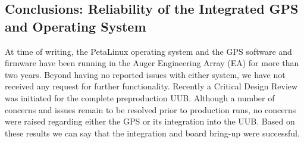 \begin{singlespace}
\section{Conclusions: Reliability of the Integrated GPS and Operating System}
\end{singlespace}
At time of writing, the PetaLinux operating system and the GPS software and firmware have been running in the Auger Engineering Array (EA) for more than two years. Beyond having no reported issues with either system, we have not received any request for further functionality. Recently a Critical Design Review was initiated for the complete preproduction UUB. Although a number of concerns and issues remain to be resolved prior to production runs, no concerns were raised regarding either the GPS or its integration into the UUB. Based on these results we can say that the integration and board bring-up were successful.







































